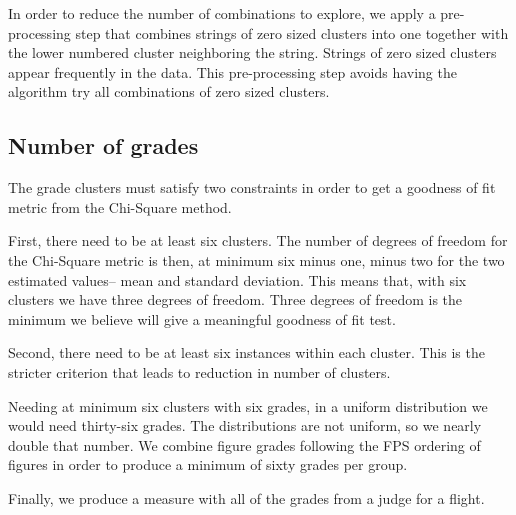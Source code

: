 In order to reduce the number of combinations to explore, we apply a
pre-processing step that combines strings of zero sized clusters into
one together with the lower numbered cluster neighboring the string.
Strings of zero sized clusters appear frequently in the data.
This pre-processing step
avoids having the algorithm try all combinations of zero sized clusters.

\subsection{Number of grades}

The grade clusters must satisfy two constraints in order to get a goodness
of fit metric from the Chi-Square method.

First, there need to be at least six clusters. The number of degrees of freedom
for the Chi-Square metric is then, at minimum six minus one, minus two for
the two estimated values-- mean and standard deviation. This means that, with
six clusters we have three degrees of freedom. Three degrees of freedom
is the minimum we believe will give a meaningful goodness of fit test.

Second, there need to be at least six instances within each cluster. This is
the stricter criterion that leads to reduction in number of clusters.

Needing at minimum six clusters with six grades, in a uniform distribution
we would need thirty-six grades. The distributions are not uniform, so we
nearly double that number. We combine figure grades following the FPS ordering
of figures in order to produce a minimum of sixty grades per group.

Finally, we produce a measure with all of the grades from a judge for a flight.
